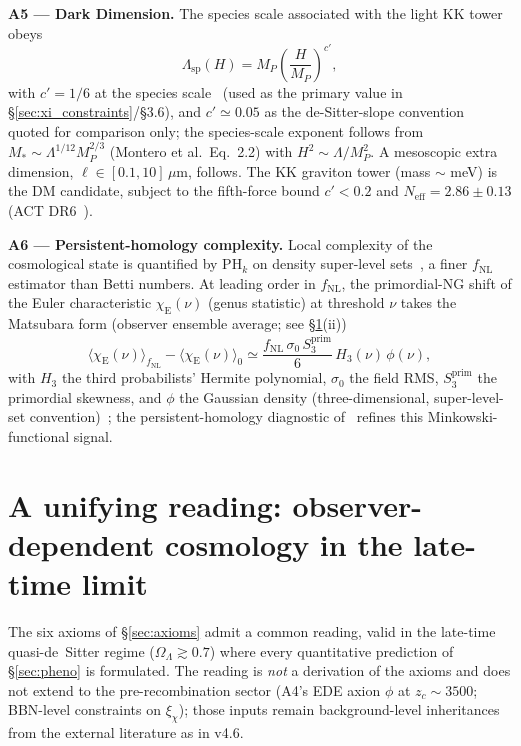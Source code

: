 \documentclass[epjc3,twocolumn]{svjour3}
\begin{document}
\smallskip
\noindent\textbf{A5 --- Dark Dimension.}
The species scale associated with the light KK tower obeys
\begin{equation}
\Lambda_{\mathrm{sp}}(H) = M_P \left( \frac{H}{M_P} \right)^{c'},
\label{eq:speciesH}
\end{equation}
with $c' = 1/6$ at the species scale~\cite{Montero2022,AAL2023} (used as the primary value in \S\ref{sec:xi_constraints}/\S3.6), and $c' \simeq 0.05$ as the de-Sitter-slope convention~\cite{AAL2025,OoguriVafa2007} quoted for comparison only; the species-scale exponent follows from $M_* \sim \Lambda^{1/12} M_P^{2/3}$ (Montero et al.\ Eq.~2.2) with $H^2 \sim \Lambda / M_P^2$.
A mesoscopic extra dimension, $\ell \in [0.1, 10] \, \mu\mathrm{m}$, follows. The KK graviton tower (mass $\sim$ meV) is the DM candidate, subject to the fifth-force bound $c' < 0.2$ and $N_{\mathrm{eff}} = 2.86 \pm 0.13$ (ACT DR6~\cite{Calabrese2025}).

\smallskip
\noindent\textbf{A6 --- Persistent-homology complexity.}
Local complexity of the cosmological state is quantified by $\mathrm{PH}_k$ on density super-level sets~\cite{Yip2024,Calles2025}, a finer $f_{\mathrm{NL}}$ estimator than Betti numbers. At leading order in $f_{\mathrm{NL}}$, the primordial-NG shift of the Euler characteristic $\chi_{\mathrm{E}}(\nu)$ (genus statistic) at threshold $\nu$ takes the Matsubara form (observer ensemble average; see \S\ref{sec:thesis}(ii))
\begin{equation}
\langle \chi_{\mathrm{E}}(\nu) \rangle_{f_{\mathrm{NL}}} - \langle \chi_{\mathrm{E}}(\nu) \rangle_{0} \simeq \frac{f_{\mathrm{NL}}\, \sigma_0\, S_3^{\mathrm{prim}}}{6}\, H_3(\nu)\, \phi(\nu),
\label{eq:A6-euler}
\end{equation}
with $H_3$ the third probabilists' Hermite polynomial, $\sigma_0$ the field RMS, $S_3^{\mathrm{prim}}$ the primordial skewness, and $\phi$ the Gaussian density (three-dimensional, super-level-set convention)~\cite{Matsubara2003}; the persistent-homology diagnostic of~\cite{Yip2024,Calles2025} refines this Minkowski-functional signal.

\section{A unifying reading: observer-dependent cosmology in the late-time limit}
\label{sec:thesis}

The six axioms of \S\ref{sec:axioms} admit a common reading, valid in the late-time
quasi-de~Sitter regime ($\Omega_\Lambda \gtrsim 0.7$) where every
quantitative prediction of \S\ref{sec:pheno} is formulated. The reading is \emph{not} a
derivation of the axioms and does not extend to the pre-recombination
sector (A4's EDE axion $\phi$ at $z_c\sim 3500$; BBN-level constraints on
$\xi_\chi$); those inputs remain background-level inheritances from the
external literature as in v4.6.
\end{document}
